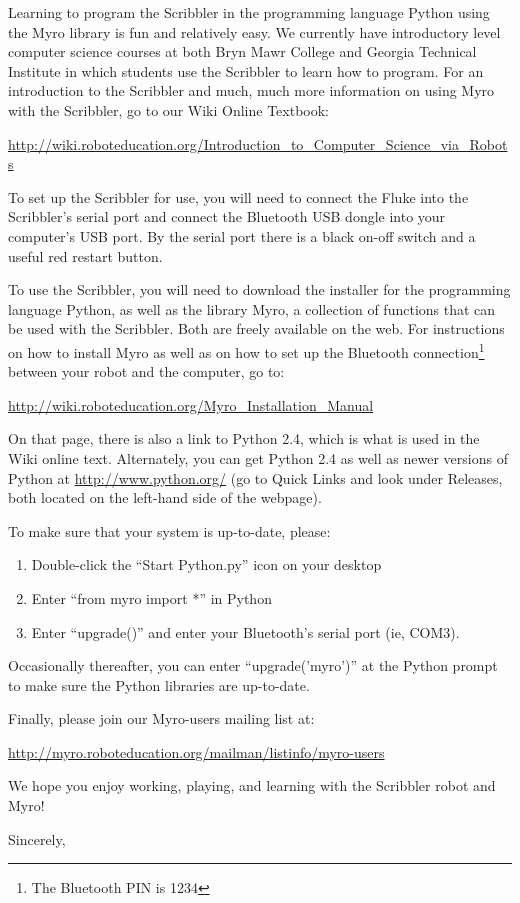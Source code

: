 \documentclass{letter}[10pt]
\begin{document}
\begin{letter}{}
Learning to program the Scribbler in the programming language Python
using the Myro library is fun and relatively easy.  We currently have
introductory level computer science courses at both Bryn Mawr College
and Georgia Technical Institute in which students use the Scribbler to
learn how to program.  For an introduction to the Scribbler and much,
much more information on using Myro with the Scribbler, go to our Wiki
Online Textbook:

\begin{small}
\url{http://wiki.roboteducation.org/Introduction_to_Computer_Science_via_Robots}
\end{small}

To set up the Scribbler for use, you will need to connect the Fluke
into the Scribbler's serial port and connect the Bluetooth USB dongle
into your computer's USB port.  By the serial port there is a black
on-off switch and a useful red restart button.

To use the Scribbler, you will need to download the installer for the
programming language Python, as well as the library Myro, a collection
of functions that can be used with the Scribbler.  Both are freely
available on the web.  For instructions on how to install Myro as well
as on how to set up the Bluetooth connection\footnote{The Bluetooth
PIN is 1234} between your robot and the computer, go to:

\begin{small}
\url{http://wiki.roboteducation.org/Myro_Installation_Manual}
\end{small}

On that page, there is also a link to Python 2.4, which is what is
used in the Wiki online text.  Alternately, you can get Python 2.4 as
well as newer versions of Python at \url{http://www.python.org/} (go to
Quick Links and look under Releases, both located on the left-hand
side of the webpage).

To make sure that your system is up-to-date, please:

\begin{enumerate}
\item Double-click the ``Start Python.py'' icon on your desktop
\item  Enter ``from myro import *'' in Python
\item Enter ``upgrade()'' and enter your Bluetooth's serial port (ie, COM3).
\end{enumerate}

Occasionally thereafter, you can enter ``upgrade('myro')'' at the Python
prompt to make sure the Python libraries are up-to-date.

Finally, please join our Myro-users mailing list at:

\begin{small}
\url{http://myro.roboteducation.org/mailman/listinfo/myro-users}
\end{small}

We hope you enjoy working, playing, and learning with the Scribbler
robot and Myro!


\closing{Sincerely,}

\end{letter}
\end{document}
